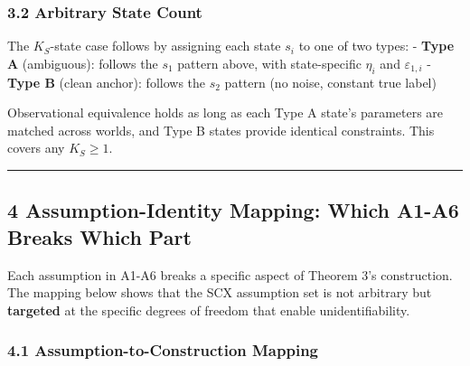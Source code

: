 \documentclass[
  12pt,
]{ctexart}
\begin{document}
\subsubsection{3.2 Arbitrary State Count}\label{arbitrary-state-count}

The \(K_S\)-state case follows by assigning each state \(s_i\) to one of
two types: - \textbf{Type A} (ambiguous): follows the \(s_1\) pattern
above, with state-specific \(\eta_i\) and \(\varepsilon_{1,i}\) -
\textbf{Type B} (clean anchor): follows the \(s_2\) pattern (no noise,
constant true label)

Observational equivalence holds as long as each Type A state's
parameters are matched across worlds, and Type B states provide
identical constraints. This covers any \(K_S \geq 1\).

\begin{center}\rule{0.5\linewidth}{0.5pt}\end{center}

\subsection{4 Assumption-Identity Mapping: Which A1-A6 Breaks Which
Part}\label{assumption-identity-mapping-which-a1-a6-breaks-which-part}

Each assumption in A1-A6 breaks a specific aspect of Theorem 3's
construction. The mapping below shows that the SCX assumption set is not
arbitrary but \textbf{targeted} at the specific degrees of freedom that
enable unidentifiability.

\subsubsection{4.1 Assumption-to-Construction
Mapping}\label{assumption-to-construction-mapping}
\end{document}
